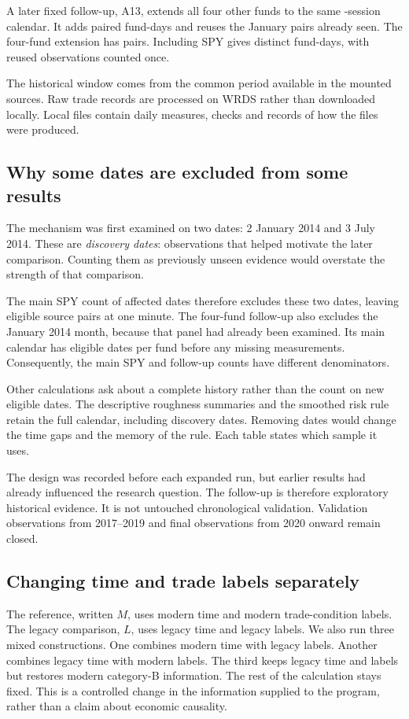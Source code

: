 A later fixed follow-up, A13, extends all four other funds to the same -session calendar. It adds  paired fund-days and reuses the  January pairs already seen. The four-fund extension has  pairs. Including SPY gives  distinct fund-days, with reused observations counted once.

The historical window comes from the common period available in the mounted sources. Raw trade records are processed on WRDS rather than downloaded locally. Local files contain daily measures, checks and records of how the files were produced.

\subsection{Why some dates are excluded from some results}
The mechanism was first examined on two dates: 2 January 2014 and 3 July 2014. These are \emph{discovery dates}: observations that helped motivate the later comparison. Counting them as previously unseen evidence would overstate the strength of that comparison.

The main SPY count of affected dates therefore excludes these two dates, leaving  eligible source pairs at one minute. The four-fund follow-up also excludes the January 2014 month, because that panel had already been examined. Its main calendar has  eligible dates per fund before any missing measurements. Consequently, the main SPY and follow-up counts have different denominators.

Other calculations ask about a complete history rather than the count on new eligible dates. The descriptive roughness summaries and the smoothed risk rule retain the full calendar, including discovery dates. Removing dates would change the time gaps and the memory of the rule. Each table states which sample it uses.

The design was recorded before each expanded run, but earlier results had already influenced the research question. The follow-up is therefore exploratory historical evidence. It is not untouched chronological validation. Validation observations from 2017--2019 and final observations from 2020 onward remain closed.

\subsection{Changing time and trade labels separately}
The reference, written $M$, uses modern time and modern trade-condition labels. The legacy comparison, $L$, uses legacy time and legacy labels. We also run three mixed constructions. One combines modern time with legacy labels. Another combines legacy time with modern labels. The third keeps legacy time and labels but restores modern category-B information.
The rest of the calculation stays fixed. This is a controlled change in the information supplied to the program, rather than a claim about economic causality.

